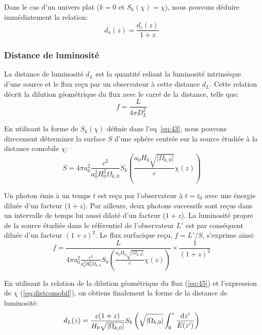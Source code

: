 \documentclass[../main/main.tex]{subfiles}
\begin{document}
Dans le cas d'un univers plat ($k=0$ et $S_{k}(\chi)=\chi$), nous
pouvons déduire immédiatement la relation:
\begin{equation}
  \label{eq:angulardistflat}
  d_{a}(z)=\frac{d_{c}(z)}{1+z}
\end{equation}


\subsubsection*{Distance de luminosité}

La distance de luminosité $d_{L}$ est la quantité reliant la luminosité
intrinsèque d'une source et le flux reçu par un observateur à cette
distance $d_{L}$. Cette relation décrit la dilution géométrique du flux
avec le carré de la distance, telle que:
\begin{equation}
  \label{eq:45}
  f=\frac{L}{4\pi D_{L}^{2}}
\end{equation}

En utilisant la forme de $S_{k}(\chi)$ définie dans l'eq~\ref{eq:43},
nous pouvons direcement déterminer la surface $S$ d'une sphére centrée
sur la source étudiée à la distance comobile $\chi$:
\begin{equation}
  \label{eq:spheredistlum}
  S=4\pi
  a_{0}^{2}\frac{c^{2}}{a_{0}^{2}H_{0}^{2}\Omega_{k,0}}S_{k}\left( \frac{a_{0}H_{0}\sqrt{\lvert\Omega_{k,0}\rvert}}{c}\chi(z)\right)
\end{equation}

Un photon émis à un temps $t$ est reçu par l'observateur à $t=t_{0}$
avec une énergie diluée d'un facteur ($1+z$). Par ailleurs, deux photons
successifs sont reçus dans un intervalle de temps lui aussi dilaté
d'un facteur ($1+z$). La luminosité propre de la source étudiée dans le
référentiel de l'observateur $L'$ est par conséquent diluée d'un facteur
$(1+z)^{2}$. Le flux surfacique reçu, $f=L'/S$, s'exprime ainsi:
\begin{equation}
  \label{eq:47}
  f=\frac{L}{4\pi
  a_{0}^{2}\frac{c^{2}}{a_{0}^{2}H_{0}^{2}\Omega_{k,0}}S_{k}\left( \frac{a_{0}H_{0}\sqrt{\lvert\Omega_{k,0}\rvert}}{c}\chi(z)\right)}\times\frac{1}{(1+z)^{2}}
\end{equation}

En utilisant la relation de la dilution géométrique du flux
(\ref{eq:45}) et l'expression de $\chi$ (\ref{eq:distcomobil}), on
obtiens finalement la forme de la distance de luminosité:
\begin{equation}
  \label{eq:48}
  d_{L}(z) = \frac{c(1+z)}{H_{0}\sqrt{\lvert\Omega_{k,0}\rvert}}S_{k}\left(\sqrt{\lvert\Omega_{k,0}\rvert}\int_{0}^{z}\frac{\mathrm{d} z'}{E(z')}\right)
\end{equation}
\end{document}

